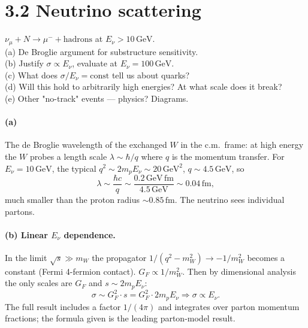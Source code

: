 \documentclass[11pt]{article}
\newcommand{\Q}[1]{\begin{question}#1\end{question}}
\newcommand{\fm}{\,\mathrm{fm}}
\newcommand{\GeV}{\,\mathrm{GeV}}
\begin{document}
\section*{3.2 \quad Neutrino scattering}

\Q{$\nu_\mu+N\to\mu^-+\mathrm{hadrons}$ at $E_\nu>10\GeV$.\\
(a) De Broglie argument for substructure sensitivity.\\
(b) Justify $\sigma\propto E_\nu$, evaluate at $E_\nu=100\GeV$.\\
(c) What does $\sigma/E_\nu=\mathrm{const}$ tell us about quarks?\\
(d) Will this hold to arbitrarily high energies? At what scale does it break?\\
(e) Other "no-track" events --- physics? Diagrams.}

\paragraph{(a)} The de Broglie wavelength of the exchanged $W$ in the c.m.\ frame: at high energy the $W$ probes a length scale $\lambda\sim\hbar/q$ where $q$ is the momentum transfer. For $E_\nu=10\GeV$, the typical $q^{2}\sim 2 m_p E_\nu\sim 20\GeV^{2}$, $q\sim 4.5\GeV$, so
\[
\lambda\sim\frac{\hbar c}{q}\sim\frac{0.2\GeV\fm}{4.5\GeV}\sim 0.04\fm,
\]
much smaller than the proton radius $\sim 0.85\fm$. The neutrino sees individual partons.

\paragraph{(b) Linear $E_\nu$ dependence.} In the limit $\sqrt{s}\gg m_W$ the propagator $1/(q^{2}-m_W^{2})\to -1/m_W^{2}$ becomes a constant (Fermi 4-fermion contact). $G_F\propto 1/m_W^{2}$. Then by dimensional analysis the only scales are $G_F$ and $s\sim 2 m_p E_\nu$:
\[
\sigma\sim G_F^{2}\cdot s = G_F^{2}\cdot 2 m_p E_\nu\Rightarrow\sigma\propto E_\nu.
\]
The full result includes a factor $1/(4\pi)$ and integrates over parton momentum fractions; the formula given is the leading parton-model result.
\end{document}
